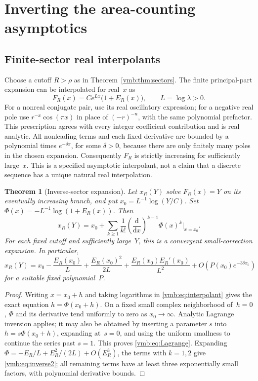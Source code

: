 \documentclass[11pt,a4paper]{article}
\numberwithin{equation}{section}
\newtheorem{theorem}{Theorem}[section]
\theoremstyle{definition}\newtheorem{definition}[theorem]{Definition}
\theoremstyle{remark}\newtheorem{remark}[theorem]{Remark}
\newcommand{\dd}{\mathrm d}
\begin{document}
\section{Inverting the area-counting asymptotics}\label{vmb:sec:inverse}

\subsection{Finite-sector real interpolants}
Choose a cutoff \(R>\rho\) as in Theorem~\ref{vmb:thm:sectors}.
The finite principal-part expansion can be interpolated for real~\(x\)
as
\begin{equation}\label{vmb:eq:interpolant}
F_R(x)=Ce^{Lx}\bigl(1+E_R(x)\bigr),\qquad L=\log\lambda>0.
\end{equation}
For a nonreal conjugate pair, use its real oscillatory expression; for
a negative real pole use \(r^{-x}\cos(\pi x)\) in place of
\((-r)^{-n}\), with the same polynomial prefactor. This prescription
agrees with every integer coefficient contribution and is real analytic.
All nonleading terms and each fixed derivative are bounded by a
polynomial times \(e^{-\delta x}\), for some \(\delta>0\), because
there are only finitely many poles in the chosen expansion.
Consequently \(F_R\) is strictly increasing for sufficiently large~\(x\).
This is a specified asymptotic interpolant, not a claim that a discrete
sequence has a unique natural real interpolation.

\begin{theorem}[Inverse-sector expansion]\label{vmb:thm:inverse}
Let \(x_R(Y)\) solve \(F_R(x)=Y\) on its eventually increasing branch,
and put \(x_0=L^{-1}\log(Y/C)\). Set
\(\Phi(x)=-L^{-1}\log(1+E_R(x))\). Then
\begin{equation}\label{vmb:eq:Lagrange}
x_R(Y)=x_0+
\sum_{k\geq1}\frac1{k!}
\left(\frac{\dd}{\dd x}\right)^{k-1}
\Phi(x)^k\bigg|_{x=x_0}.
\end{equation}
For each fixed cutoff and sufficiently large~\(Y\), this is a
convergent small-correction expansion. In particular,
\begin{equation}\label{vmb:eq:inverse2}
x_R(Y)=x_0-\frac{E_R(x_0)}L
 +\frac{E_R(x_0)^2}{2L}
 +\frac{E_R(x_0)E_R'(x_0)}{L^2}
 +O\!\left(P(x_0)e^{-3\delta x_0}\right)
\end{equation}
for a suitable fixed polynomial~\(P\).
\end{theorem}
\begin{proof}
Writing \(x=x_0+h\) and taking logarithms in \eqref{vmb:eq:interpolant}
gives the exact equation \(h=\Phi(x_0+h)\). On a fixed small complex
neighborhood of~\(h=0\), \(\Phi\) and its derivative tend uniformly to
zero as \(x_0\to\infty\). Analytic Lagrange inversion applies; it may
also be obtained by inserting a parameter \(s\) into
\(h=s\Phi(x_0+h)\), expanding at~\(s=0\), and using the uniform smallness
to continue the series past \(s=1\). This proves \eqref{vmb:eq:Lagrange}.
Expanding \(\Phi=-E_R/L+E_R^2/(2L)+O(E_R^3)\), the terms with
\(k=1,2\) give \eqref{vmb:eq:inverse2}; all remaining terms have at least
three exponentially small factors, with polynomial derivative bounds.
\end{proof}
\end{document}
